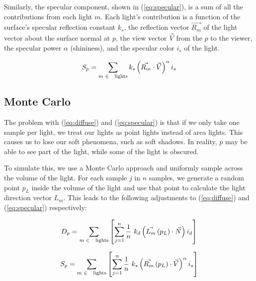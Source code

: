 \documentclass{acmsiggraph}                     %
\begin{document}
    Similarly, the specular component, shown in (\ref{eq:specular}), is a sum of all the
    contributions from each light $m$. Each light's contribution is a function of the
    surface's specular reflection constant $k_{s}$, the reflection vector $\vec{R_{m}}$
    of the light vector about the surface normal at $p$, the view vector $\vec{V}$ from
    the $p$ to the viewer, the specular power $\alpha$ (shininess), and the specular
    color $i_{s}$ of the light.

    \begin{equation}
        \label{eq:specular}
        S_{p} = \sum_{m \textrm{ } \in \textrm{\small{ lights}}}^{}
            k_{s} \left( \vec{R_{m}} \cdot \vec{V} \right) ^{\alpha} i_{s} 
    \end{equation}

    \subsection{Monte Carlo}
    \label{sec:montecarlo}

    The problem with (\ref{eq:diffuse}) and (\ref{eq:specular}) is that if we only take one
    sample per light, we treat our lights as point lights instead of area lights. This causes
    us to lose our soft phenomena, such as soft shadows. In reality, $p$ may be able to see
    part of the light, while some of the light is obscured.
    
    To simulate this, we use a Monte Carlo approach and uniformly sample across the volume
    of the light. For each sample $j$ in $n$ samples, we generate a random point $p_{L}$
    inside the volume of the light and use that point to calculate the light direction vector
    $L_{m}$. This leads to the following adjustments to (\ref{eq:diffuse}) and
    (\ref{eq:specular}) respectively:

    \begin{equation}
        \label{eq:diffuse_mc}
        D_{p} = \sum_{m \textrm{ } \in \textrm{\small{ lights}}}^{} \left[
            \sum_{j = 1}^{n} \frac{1}{n} \textrm{ }
                k_{d} \left( \vec{L_{m}} \left( p_{L} \right) \cdot \vec{N} \right) i_{d}
        \right]
    \end{equation}

    \begin{equation}
        \label{eq:specular_mc}
        S_{p} = \sum_{m \textrm{ } \in \textrm{\small{ lights}}}^{} \left[
            \sum_{j = 1}^{n} \frac{1}{n} \textrm{ }
                k_{s} \left( \vec{R_{m}} \left( p_{L} \right) \cdot \vec{V} \right) ^{\alpha} i_{s}
        \right]
    \end{equation}
\end{document}
